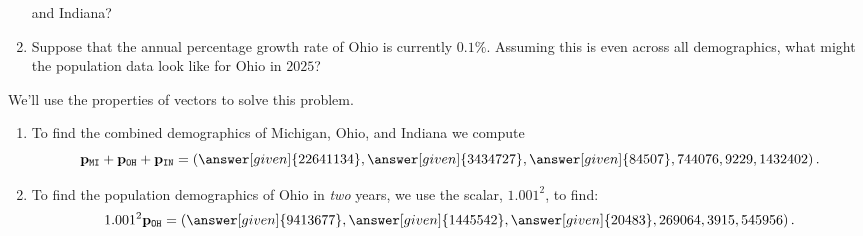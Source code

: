 \documentclass{ximera}
\begin{document}
\begin{example}
\begin{enumerate}
  and Indiana?
\item Suppose that the annual percentage growth rate of Ohio is
  currently $0.1\%$. Assuming this is even across all demographics,
  what might the population data look like for Ohio in $2025$?
\end{enumerate}
\begin{explanation}
  We'll use the properties of vectors to solve this problem.
  \begin{enumerate}
  \item To find the combined demographics of Michigan, Ohio, and
    Indiana we compute
    \[
    \vec{p}_{\texttt{MI}} + \vec{p}_{\texttt{OH}} + \vec{p}_{\texttt{IN}} = \left(\answer[given]{22641134},\answer[given]{3434727},\answer[given]{84507},744076,9229,1432402\right).
    \]
  \item To find the population demographics of Ohio in \textit{two}
    years, we use the scalar, $1.001^2$, to find:
    \[
      1.001^2 \vec{p}_{\texttt{OH}}
      =\left(\answer[given]{9413677},\answer[given]{1445542},\answer[given]{20483},269064,3915,545956
      \right).
    \]
  \end{enumerate}
\end{explanation}
\end{example}
\end{document}
